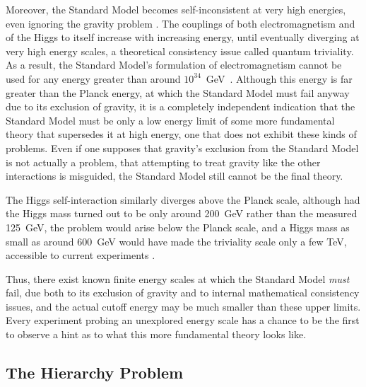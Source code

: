   Moreover, the Standard Model becomes self-inconsistent at very high energies, even ignoring the gravity problem \cite{landaupole,higgstriviality}.
  The couplings of both electromagnetism and of the Higgs to itself increase with increasing energy, until eventually diverging at very high energy scales, a theoretical consistency issue called quantum triviality.
  As a result, the Standard Model's formulation of electromagnetism cannot be used for any energy greater than around $10^{34}$~GeV~\cite{landaupole}.
  Although this energy is far greater than the Planck energy, at which the Standard Model must fail anyway due to its exclusion of gravity, it is a completely independent indication that the Standard Model must be only a low energy limit of some more fundamental theory that supersedes it at high energy, one that does not exhibit these kinds of problems.
  Even if one supposes that gravity's exclusion from the Standard Model is not actually a problem, that attempting to treat gravity like the other interactions is misguided, the Standard Model still cannot be the final theory.

  The Higgs self-interaction similarly diverges above the Planck scale, although had the Higgs mass turned out to be only around 200~GeV rather than the measured 125~GeV, the problem would arise below the Planck scale, and a Higgs mass as small as around 600~GeV would have made the triviality scale only a few TeV, accessible to current experiments \cite{higgstriviality}.

  Thus, there exist known finite energy scales at which the Standard Model {\it must} fail, due both to its exclusion of gravity and to internal mathematical consistency issues, and the actual cutoff energy may be much smaller than these upper limits.
  Every experiment probing an unexplored energy scale has a chance to be the first to observe a hint as to what this more fundamental theory looks like.

  \subsection{The Hierarchy Problem} \label{sec:hierarchy}

